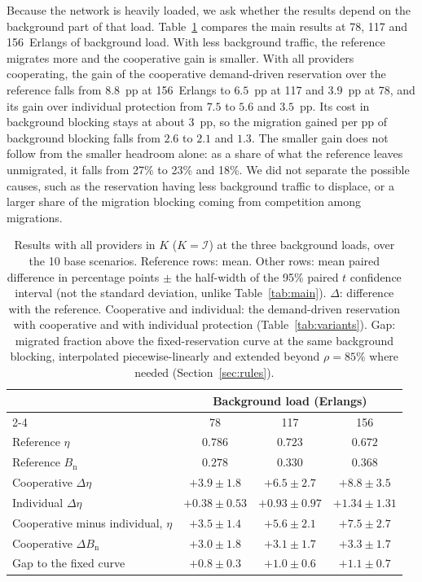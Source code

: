 \documentclass[11pt,a4paper]{article}
\theoremstyle{definition}
\begin{document}
Because the network is heavily loaded, we ask whether the results depend on the background part of that load.
Table~\ref{tab:load} compares the main results at 78, 117 and 156~Erlangs of background load.
With less background traffic, the reference migrates more and the cooperative gain is smaller.
With all providers cooperating, the gain of the cooperative demand-driven reservation over the reference falls from $8.8$~pp at 156~Erlangs to $6.5$~pp at 117 and $3.9$~pp at 78, and its gain over individual protection from $7.5$ to $5.6$ and $3.5$~pp.
Its cost in background blocking stays at about $3$~pp, so the migration gained per pp of background blocking falls from $2.6$ to $2.1$ and $1.3$.
The smaller gain does not follow from the smaller headroom alone: as a share of what the reference leaves unmigrated, it falls from 27\% to 23\% and 18\%.
We did not separate the possible causes, such as the reservation having less background traffic to displace, or a larger share of the migration blocking coming from competition among migrations.

\begin{table}[!htb]
\centering
\small
\caption{Results with all providers in $K$ ($K=\mathcal{I}$) at the three background loads, over the 10 base scenarios. Reference rows: mean. Other rows: mean paired difference in percentage points $\pm$ the half-width of the 95\% paired $t$ confidence interval (not the standard deviation, unlike Table~\ref{tab:main}). $\Delta$: difference with the reference. Cooperative and individual: the demand-driven reservation with cooperative and with individual protection (Table~\ref{tab:variants}). Gap: migrated fraction above the fixed-reservation curve at the same background blocking, interpolated piecewise-linearly and extended beyond $\rho=85\%$ where needed (Section~\ref{sec:rules}).}
\label{tab:load}
\setlength{\tabcolsep}{4pt}
\begin{tabular}{@{}lccc@{}}
\toprule
 & \multicolumn{3}{c}{Background load (Erlangs)} \\
\cmidrule(l){2-4}
 & 78 & 117 & 156 \\
\midrule
Reference $\eta$ & $0.786$ & $0.723$ & $0.672$ \\
Reference $B_\mathrm{n}$ & $0.278$ & $0.330$ & $0.368$ \\
\midrule
Cooperative $\Delta\eta$ & $+3.9\pm1.8$ & $+6.5\pm2.7$ & $+8.8\pm3.5$ \\
Individual $\Delta\eta$ & $+0.38\pm0.53$ & $+0.93\pm0.97$ & $+1.34\pm1.31$ \\
Cooperative minus individual, $\eta$ & $+3.5\pm1.4$ & $+5.6\pm2.1$ & $+7.5\pm2.7$ \\
Cooperative $\Delta B_\mathrm{n}$ & $+3.0\pm1.8$ & $+3.1\pm1.7$ & $+3.3\pm1.7$ \\
Gap to the fixed curve & $+0.8\pm0.3$ & $+1.0\pm0.6$ & $+1.1\pm0.7$ \\
\bottomrule
\end{tabular}
\end{table}
\end{document}
